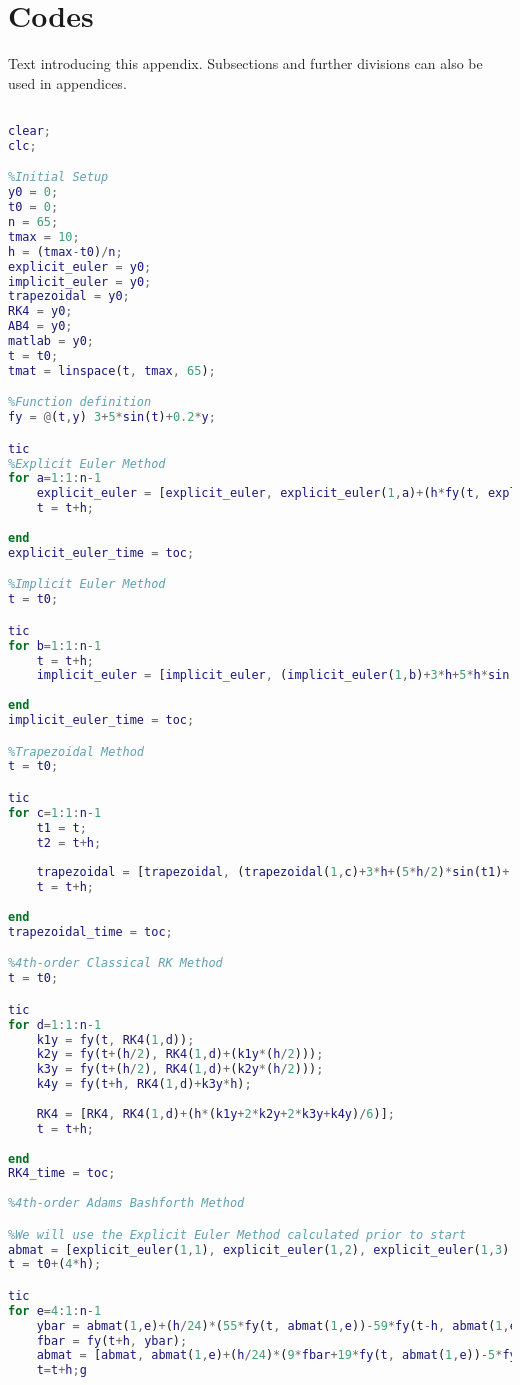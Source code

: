\documentclass[11pt]{article}
\begin{document}
\section{Codes}\label{S:A}
%
Text introducing this appendix. Subsections and further divisions can also be used 
in appendices. 
\begin{lstlisting}[language=Matlab]
%Group 2, problem 1

clear;
clc;

%Initial Setup
y0 = 0;
t0 = 0;
n = 65;
tmax = 10;
h = (tmax-t0)/n;
explicit_euler = y0;
implicit_euler = y0;
trapezoidal = y0;
RK4 = y0;
AB4 = y0;
matlab = y0;
t = t0;
tmat = linspace(t, tmax, 65);

%Function definition
fy = @(t,y) 3+5*sin(t)+0.2*y;

tic
%Explicit Euler Method
for a=1:1:n-1
    explicit_euler = [explicit_euler, explicit_euler(1,a)+(h*fy(t, explicit_euler(1,a)))];
    t = t+h;
   
end
explicit_euler_time = toc;

%Implicit Euler Method
t = t0;

tic
for b=1:1:n-1
    t = t+h;
    implicit_euler = [implicit_euler, (implicit_euler(1,b)+3*h+5*h*sin(t))/(1-0.2*h)];
    
end
implicit_euler_time = toc;

%Trapezoidal Method
t = t0;

tic
for c=1:1:n-1
    t1 = t;
    t2 = t+h;
    
    trapezoidal = [trapezoidal, (trapezoidal(1,c)+3*h+(5*h/2)*sin(t1)+(h/10)*trapezoidal(1,c)+(5*h/2)*sin(t2))/(1-h/10)];
    t = t+h;
    
end
trapezoidal_time = toc;

%4th-order Classical RK Method
t = t0;

tic
for d=1:1:n-1   
    k1y = fy(t, RK4(1,d));
    k2y = fy(t+(h/2), RK4(1,d)+(k1y*(h/2)));
    k3y = fy(t+(h/2), RK4(1,d)+(k2y*(h/2)));
    k4y = fy(t+h, RK4(1,d)+k3y*h);
    
    RK4 = [RK4, RK4(1,d)+(h*(k1y+2*k2y+2*k3y+k4y)/6)];
    t = t+h;
    
end
RK4_time = toc;
    
%4th-order Adams Bashforth Method

%We will use the Explicit Euler Method calculated prior to start
abmat = [explicit_euler(1,1), explicit_euler(1,2), explicit_euler(1,3), explicit_euler(1,4)];
t = t0+(4*h);

tic
for e=4:1:n-1  
    ybar = abmat(1,e)+(h/24)*(55*fy(t, abmat(1,e))-59*fy(t-h, abmat(1,e-1))+37*fy(t-2*h, abmat(1,e-2))-9*fy(t-3*h, abmat(1,e-3)));
    fbar = fy(t+h, ybar);
    abmat = [abmat, abmat(1,e)+(h/24)*(9*fbar+19*fy(t, abmat(1,e))-5*fy(t-h, abmat(1,e-1))+fy(t-2*h, abmat(1,e-2)))];
    t=t+h;g
    

\end{lstlisting}
\end{document}
